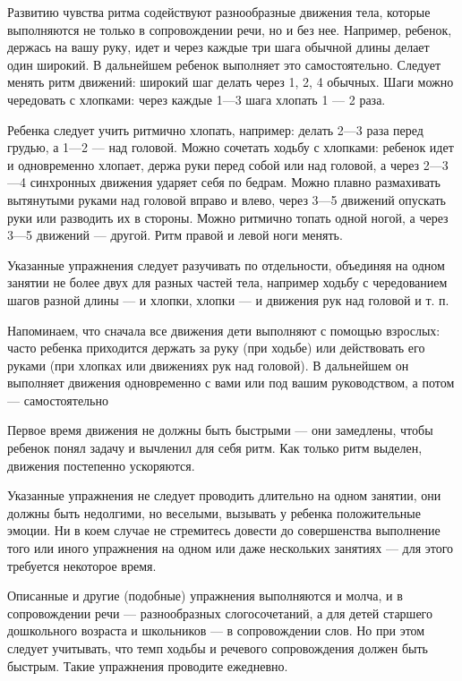 \documentclass{book}
\begin{document}
Развитию чувства ритма содействуют разнообразные движения тела, которые
выполняются не только в сопровождении речи, но и без нее. Например,
ребенок, держась на вашу руку, идет и через каждые три шага обычной
длины делает один широкий. В дальнейшем ребенок выполняет это
самостоятельно. Следует менять ритм движений: широкий шаг делать через
1, 2, 4 обычных. Шаги можно чередовать с хлопками: через каждые 1---3
шага хлопать 1 --- 2 раза.

Ребенка следует учить ритмично хлопать, например: делать 2---3 раза
перед грудью, а 1---2 --- над головой. Можно сочетать ходьбу с хлопками:
ребенок идет и одновременно хлопает, держа руки перед собой или над
головой, а через 2---3---4 синхронных движения ударяет себя по бедрам.
Можно плавно размахивать вытянутыми руками над головой вправо и влево,
через 3---5 движений опускать руки или разводить их в стороны. Можно
ритмично топать одной ногой, а через 3---5 движений --- другой. Ритм
правой и левой ноги менять.

Указанные упражнения следует разучивать по отдельности, объединяя на
одном занятии не более двух для разных частей тела, например ходьбу с
чередованием шагов разной длины --- и хлопки, хлопки --- и движения рук
над головой и т. п.

Напоминаем, что сначала все движения дети выполняют с помощью взрослых:
часто ребенка приходится держать за руку (при ходьбе) или действовать
его руками (при хлопках или движениях рук над головой). В дальнейшем он
выполняет движения одновременно с вами или под вашим руководством, а
потом --- самостоятельно

Первое время движения не должны быть быстрыми --- они замедлены, чтобы
ребенок понял задачу и вычленил для себя ритм. Как только ритм выделен,
движения постепенно ускоряются.

Указанные упражнения не следует проводить длительно на одном занятии,
они должны быть недолгими, но веселыми, вызывать у ребенка положительные
эмоции. Ни в коем случае не стремитесь довести до совершенства
выполнение того или иного упражнения на одном или даже нескольких
занятиях --- для этого требуется некоторое время.

Описанные и другие (подобные) упражнения выполняются и молча, и в
сопровождении речи --- разнообразных слогосочетаний, а для детей
старшего дошкольного возраста и школьников --- в сопровождении слов. Но
при этом следует учитывать, что темп ходьбы и речевого сопровождения
должен быть быстрым. Такие упражнения проводите ежедневно.
\end{document}
